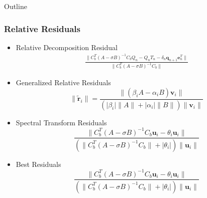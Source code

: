 \documentclass[landscape]{beamer}
\begin{document}
\begin{frame}[allowframebreaks]{Outline}
  \frametitle{Relative Residuals}
  
  \begin{itemize}
  \item Relative Decomposition Residual
    \begin{align*}
    	\frac{\|C_b^T (A-\sigma B)^{-1} C_bQ_n - Q_nT_n - \delta_{n}\mathbf{q}_{n+1}\mathbf{e}_n^T\|}{\|C_b^T (A-\sigma B)^{-1} C_b\|}
    \end{align*}
  \item Generalized Relative Residuals
    \begin{equation*}
    	\|\tilde{\mathbf{r}}_i\| = \frac{\| (\beta_i A - \alpha_i B)\mathbf{v}_i \| }{(\lvert \beta_i \rvert \|A\| + \lvert \alpha_i \rvert \|B\|)\|\mathbf{v}_i\| }
    \end{equation*}
   \item Spectral Transform Residuals
   \begin{equation*}
	 \frac{\| C_b^T(A - \sigma B)^{-1}C_b \mathbf{u}_i - \theta_i \mathbf{u}_i \| }{( \| C_b^T(A - \sigma B)^{-1}C_b \| + \lvert \theta_i \rvert)\|\mathbf{u}_i\| }
   \end{equation*}
   
   \item Best Residuals
   \begin{equation*}
   	 \frac{\| C_b^T(A - \sigma B)^{-1}C_b \mathbf{u}_i - \theta_i \mathbf{u}_i \| }{( \| C_b^T(A - \sigma B)^{-1}C_b \| + \lvert \theta_i \rvert)\|\mathbf{u}_i\| }
   \end{equation*}
   
  \end{itemize}
\end{frame}
\end{document}
